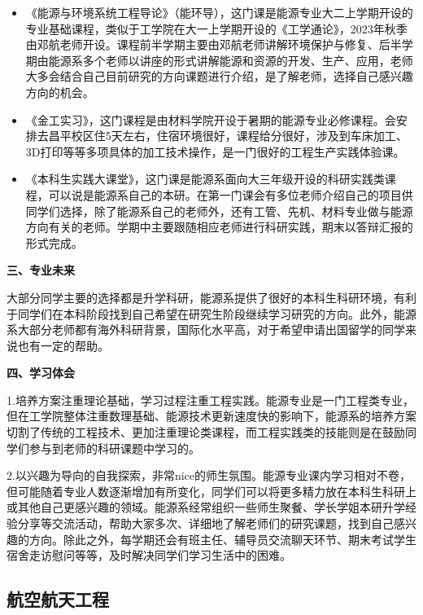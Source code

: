 \documentclass[11pt,oneside]{book}
\begin{document}
\begin{itemize}
    \item 《能源与环境系统工程导论》（能环导），这门课是能源专业大二上学期开设的专业基础课程，类似于工学院在大一上学期开设的《工学通论》，2023年秋季由邓航老师开设。课程前半学期主要由邓航老师讲解环境保护与修复、后半学期由能源系多个老师以讲座的形式讲解能源和资源的开发、生产、应用，老师大多会结合自己目前研究的方向课题进行介绍，是了解老师，选择自己感兴趣方向的机会。

    \item 《金工实习》，这门课程是由材料学院开设于暑期的能源专业必修课程。会安排去昌平校区住5天左右，住宿环境很好，课程给分很好，涉及到车床加工、3D打印等等多项具体的加工技术操作，是一门很好的工程生产实践体验课。

    \item 《本科生实践大课堂》，这门课是能源系面向大三年级开设的科研实践类课程，可以说是能源系自己的本研。在第一门课会有多位老师介绍自己的项目供同学们选择，除了能源系自己的老师外，还有工管、先机、材料专业做与能源方向有关的老师。学期中主要跟随相应老师进行科研实践，期末以答辩汇报的形式完成。

\end{itemize}

\textbf{三、专业未来}

大部分同学主要的选择都是升学科研，能源系提供了很好的本科生科研环境，有利于同学们在本科阶段找到自己希望在研究生阶段继续学习研究的方向。此外，能源系大部分老师都有海外科研背景，国际化水平高，对于希望申请出国留学的同学来说也有一定的帮助。

\vspace{10pt}

\textbf{四、学习体会}

1.培养方案注重理论基础，学习过程注重工程实践。能源专业是一门工程类专业，但在工学院整体注重数理基础、能源技术更新速度快的影响下，能源系的培养方案切割了传统的工程技术、更加注重理论类课程，而工程实践类的技能则是在鼓励同学们参与到老师的科研课题中学习的。

\vspace{10pt}

2.以兴趣为导向的自我探索，非常nice的师生氛围。能源专业课内学习相对不卷，但可能随着专业人数逐渐增加有所变化，同学们可以将更多精力放在本科生科研上或其他自己更感兴趣的领域。能源系经常组织一些师生聚餐、学长学姐本研升学经验分享等交流活动，帮助大家多次、详细地了解老师们的研究课题，找到自己感兴趣的方向。除此之外，每学期还会有班主任、辅导员交流聊天环节、期末考试学生宿舍走访慰问等等，及时解决同学们学习生活中的困难。

\subsection{航空航天工程}
\end{document}

